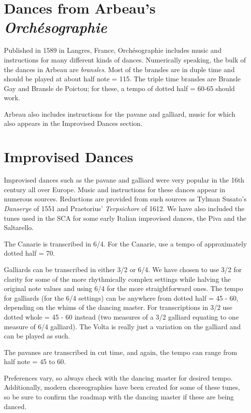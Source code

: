 \documentclass[11pt]{book}
\begin{document}
\clearpage


\chapter{Dances from Arbeau's {\em Orchésographie}}

Published in 1589 in Langres, France, Orchésographie includes music and
instructions for many different kinds of dances. Numerically speaking, the bulk
of the dances in Arbeau are {\em bransles}. Most of the bransles are in duple
time and should be played at about half note = 115.  The triple time bransles
are Bransle Gay and Bransle de Poictou; for these, a tempo of dotted half =
60-65 should work.

Arbeau also includes instructions for the pavane and galliard, music for which
also appears in the Improvised Dances section.

\clearpage


\chapter{Improvised Dances}

Improvised dances such as the pavane and galliard were very popular in the 16th
century all over Europe. Music and instructions for these dances appear in
numerous sources. Reductions are provided from such sources as Tylman Susato's
{\em Danserye} of 1551 and Praetorius' {\em Terpsichore} of 1612. We have also
included the tunes used in the SCA for some early Italian improvised dances,
the Piva and the Saltarello.

The Canarie is transcribed in 6/4. For the Canarie, use a tempo of
approximately dotted half = 70.

Galliards can be transcribed in either 3/2 or 6/4. We have chosen to use 3/2
for clarity for some of the more rhythmically complex settings while halving
the original note values and using 6/4 for the more straightforward ones. The
tempo for galliards (for the 6/4 settings) can be anywhere from dotted half =
45 - 60, depending on the whims of the dancing master. For transcriptions in
3/2 use dotted whole = 45 - 60 instead (two measures of a 3/2 galliard equating
to one measure of 6/4 galliard). The Volta is really just a variation on the
galliard and can be played as such.

The pavanes are transcribed in cut time, and again, the tempo can range from
half note = 45 to 60.

Preferences vary, so always check with the dancing master for desired tempo.
Additionally, modern choreographies have been created for some of these tunes,
so be sure to confirm the roadmap with the dancing master if these are being
danced.
\end{document}
